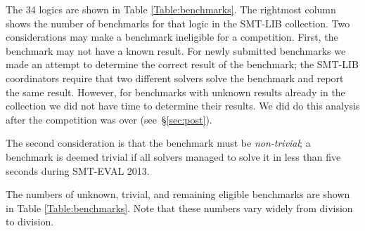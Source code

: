 \documentclass[twoside,11pt]{article}
\begin{document}
The 34 logics are shown in Table \ref{Table:benchmarks}. The rightmost column shows the number of benchmarks for that logic in the SMT-LIB collection. Two considerations may make a benchmark ineligible for a competition. First, the benchmark may not have a known result. For newly submitted benchmarks
we made an attempt to determine the correct result of the benchmark; the SMT-LIB coordinators require that two
different solvers solve the benchmark and report the same result. However, for benchmarks with unknown results already in the collection we did not have time to determine their results. We did do this analysis after the competition was over (see~\S\ref{sec:post}).

The second consideration is that the benchmark must be \emph{non-trivial}; a benchmark is deemed trivial if all solvers managed to solve it in less than five seconds during SMT-EVAL 2013.

The numbers of unknown, trivial, and remaining eligible benchmarks are shown in Table \ref{Table:benchmarks}. Note that these numbers vary widely from division to division.
\end{document}
